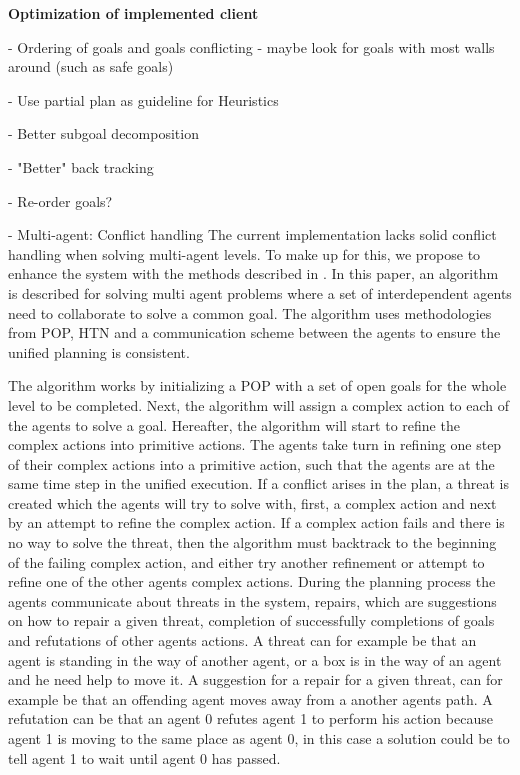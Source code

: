 \documentclass[Main]{subfiles}
\begin{document}
\textbf{Optimization of implemented client}


- Ordering of goals and goals conflicting - maybe look for goals with most walls around (such as safe goals)

- Use partial plan as guideline for Heuristics

- Better subgoal decomposition

- "Better" back tracking

- Re-order goals?

- Multi-agent: Conflict handling
The current implementation lacks solid conflict handling when solving multi-agent levels. To make up for this, we propose to enhance the system with the methods described in \cite{pellier2007unified}.
In this paper, an algorithm is described for solving multi agent problems where a set of interdependent agents need to collaborate to solve a common goal.
The algorithm uses methodologies from POP, HTN and a communication scheme between the agents to ensure the unified planning is consistent.

The algorithm works by initializing a POP with a set of open goals for the whole level to be completed. Next, the algorithm will assign a complex action to each of the agents to solve a goal.
Hereafter, the algorithm will start to refine the complex actions into primitive actions.
The agents take turn in refining one step of their complex actions into a primitive action, such that the agents are at the same time step in the unified execution.
If a conflict arises in the plan, a threat is created which the agents will try to solve with, first, a complex action and next by an attempt to refine the complex action.
If a complex action fails and there is no way to solve the threat, then the algorithm must backtrack to the beginning of the failing complex action, and either try another refinement or attempt to refine one of the other agents complex actions.
During the planning process the agents communicate about threats in the system, repairs, which are suggestions on how to repair a given threat, completion of successfully completions of goals and refutations of other agents actions.
A threat can for example be that an agent is standing in the way of another agent, or a box is in the way of an agent and he need help to move it.
A suggestion for a repair for a given threat, can for example be that an offending agent moves away from a another agents path.
A refutation can be that an agent 0 refutes agent 1 to perform his action because agent 1 is moving to the same place as agent 0, in this case a solution could be to tell agent 1 to wait until agent 0 has passed.
\end{document}
